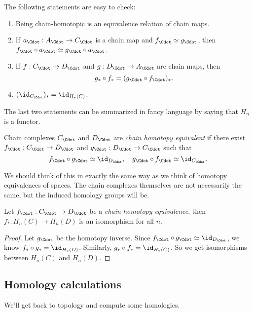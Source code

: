 \documentclass[a4paper]{article}
\begin{document}
The following statements are easy to check:
\begin{prop}\leavevmode
  \begin{enumerate}
    \item Being chain-homotopic is an equivalence relation of chain maps.
    \item If $a_{\Cdot}: A_{\Cdot} \to C_{\Cdot}$ is a chain map and $f_{\Cdot} \simeq g_{\Cdot}$, then $f_{\Cdot} \circ a_{\Cdot} \simeq g_{\Cdot} \circ a_{\Cdot}$.
    \item If $f: C_{\Cdot} \to D_{\Cdot}$ and $g: D_{\Cdot} \to A_{\Cdot}$ are chain maps, then
      \[
        g_* \circ f_* = (g_{\Cdot} \circ f_{\Cdot})_*.
      \]
    \item $(\id_{C_{\Cdot}})_* = \id_{H_*(C)}$.
  \end{enumerate}
\end{prop}
The last two statements can be summarized in fancy language by saying that $H_n$ is a functor.

\begin{defi}
  Chain complexes $C_{\Cdot}$ and $D_{\Cdot}$ are \emph{chain homotopy equivalent} if there exist $f_{\Cdot}: C_{\Cdot} \to D_{\Cdot}$ and $g_{\Cdot}: D_{\Cdot}\to C_{\Cdot}$ such that
  \[
    f_{\Cdot} \circ g_{\Cdot} \simeq \id_{D_{\Cdot}},\quad g_{\Cdot} \circ f_{\Cdot}\simeq \id_{C_{\Cdot}}.
  \]
\end{defi}
We should think of this in exactly the same way as we think of homotopy equivalences of spaces. The chain complexes themselves are not necessarily the same, but the induced homology groups will be.

\begin{lemma}
  Let $f_{\Cdot}: C_{\Cdot} \to D_{\Cdot}$ be a \emph{chain homotopy equivalence}, then $f_*: H_n(C) \to H_n(D)$ is an isomorphism for all $n$.
\end{lemma}

\begin{proof}
  Let $g_{\Cdot}$ be the homotopy inverse. Since $f_{\Cdot} \circ g_{\Cdot} \simeq \id_{D_{\Cdot}}$, we know $f_* \circ g_* = \id_{H_*(D)}$. Similarly, $g_* \circ f_* = \id_{H_*(C)}$. So we get isomorphisms between $H_n(C)$ and $H_n(D)$.
\end{proof}

\subsection{Homology calculations}
We'll get back to topology and compute some homologies.
\end{document}
